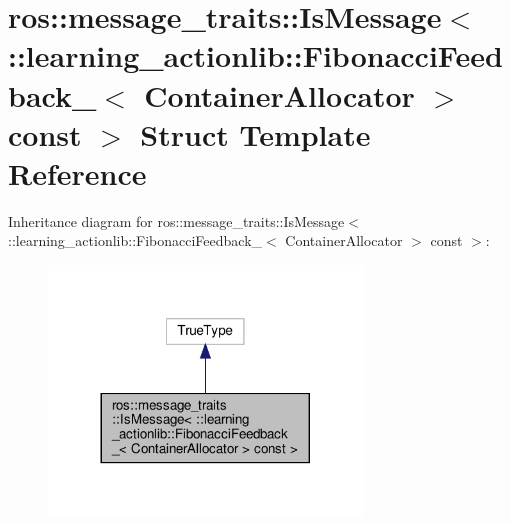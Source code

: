 \hypertarget{structros_1_1message__traits_1_1IsMessage_3_01_1_1learning__actionlib_1_1FibonacciFeedback___3_068e9a613bb62c853e089f5c7f4f98e1b}{}\section{ros\+:\+:message\+\_\+traits\+:\+:Is\+Message$<$ \+:\+:learning\+\_\+actionlib\+:\+:Fibonacci\+Feedback\+\_\+$<$ Container\+Allocator $>$ const $>$ Struct Template Reference}
\label{structros_1_1message__traits_1_1IsMessage_3_01_1_1learning__actionlib_1_1FibonacciFeedback___3_068e9a613bb62c853e089f5c7f4f98e1b}


Inheritance diagram for ros\+:\+:message\+\_\+traits\+:\+:Is\+Message$<$ \+:\+:learning\+\_\+actionlib\+:\+:Fibonacci\+Feedback\+\_\+$<$ Container\+Allocator $>$ const $>$\+:
\nopagebreak
\begin{figure}[H]
\begin{center}
\leavevmode
\includegraphics[width=236pt]{structros_1_1message__traits_1_1IsMessage_3_01_1_1learning__actionlib_1_1FibonacciFeedback___3_077e0147f788101ad8b403939bce13fe8}
\end{center}
\end{figure}


